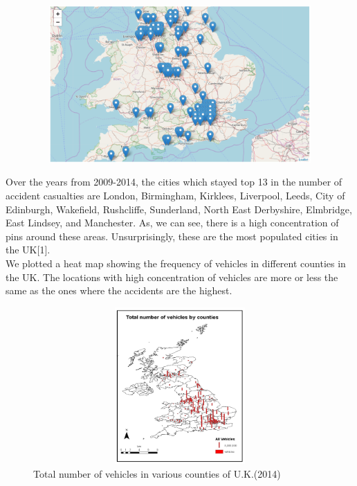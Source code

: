 \documentclass[a4paper, 10pt]{article}
\begin{document}
    \begin{center}
      \includegraphics[width=70cm,height=6cm, scale=0.4,keepaspectratio]{map2.png}
    \end{center}

    Over the years from 2009-2014, the cities which stayed top 13 in the number of accident casualties are London, Birmingham, Kirklees, Liverpool, Leeds, City of Edinburgh, Wakefield, Rushcliffe, Sunderland, North East Derbyshire, Elmbridge, East Lindsey, and Manchester. As, we can see, there is a high concentration of pins around these areas. Unsurprisingly, these are the most populated cities in the UK[1]. \\

 We plotted a heat map showing the frequency of vehicles in different counties in the UK. The locations with high concentration of vehicles are more or less the same as the ones where the accidents are the highest. \\

 \begin{figure}
   \begin{center}
     \includegraphics[width=70cm,height=6cm, scale=0.4,keepaspectratio]{vehicles-by-county.png}
     \caption{Total number of vehicles in various counties of U.K.(2014)}
    \end{center}
  \end{figure}
\end{document}
